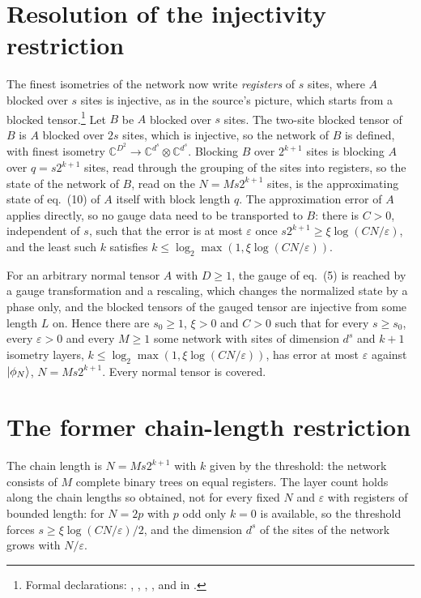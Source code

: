 \documentclass{article}
\begin{document}
\section{Resolution of the injectivity restriction}
The finest isometries of the network now write \emph{registers} of $s$ sites,
where $A$ blocked over $s$ sites is injective, as in the source's picture,
which starts from a blocked tensor.\footnote{Formal declarations:
    ,
    ,
    ,
    ,
    and
    in .}
Let $B$ be $A$ blocked over $s$ sites. The two-site blocked tensor of $B$ is
$A$ blocked over $2s$ sites, which is injective, so the network of $B$ is
defined, with finest isometry $\mathbb{C}^{D^2}\to\mathbb{C}^{d^s}\otimes\mathbb{C}^{d^s}$. Blocking $B$
over $2^{k+1}$ sites is blocking $A$ over $q=s2^{k+1}$ sites, read through the
grouping of the sites into registers, so the state of the network of $B$, read
on the $N=Ms2^{k+1}$ sites, is the approximating state of eq.~(10) of $A$ itself
with block length $q$. The approximation error of $A$ applies directly, so no
gauge data need to be transported to $B$: there is $C>0$, independent of $s$,
such that the error is at most $\varepsilon$ once
$s2^{k+1}\ge\xi\log(CN/\varepsilon)$, and the least such $k$ satisfies
$k\le\log_2\max(1,\xi\log(CN/\varepsilon))$.

For an arbitrary normal tensor $A$ with $D\ge1$, the gauge of eq.~(5) is
reached by a gauge transformation and a rescaling, which changes the
normalized state by a phase only, and the blocked tensors of the gauged tensor
are injective from some length $L$ on. Hence there are $s_0\ge1$, $\xi>0$ and
$C>0$ such that for every $s\ge s_0$, every $\varepsilon>0$ and every $M\ge1$
some network with sites of dimension $d^s$ and $k+1$ isometry layers,
$k\le\log_2\max(1,\xi\log(CN/\varepsilon))$, has error at most
$\varepsilon$ against $|\phi_N\rangle$, $N=Ms2^{k+1}$. Every normal tensor is
covered.

\section{The former chain-length restriction}
The chain length is $N=Ms2^{k+1}$ with $k$ given by the threshold: the network
consists of $M$ complete binary trees on equal registers. The layer count holds
along the chain lengths so obtained, not for every fixed $N$ and $\varepsilon$
with registers of bounded length: for $N=2p$ with $p$ odd only $k=0$ is
available, so the threshold forces $s\ge\xi\log(CN/\varepsilon)/2$, and the
dimension $d^s$ of the sites of the network grows with $N/\varepsilon$.
\end{document}
